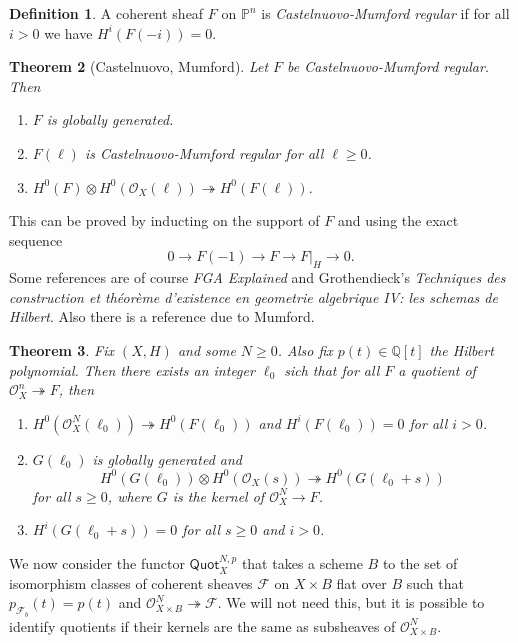 \documentclass[leqno, openany]{memoir}
\newtheorem{thm}{Theorem}[section]
\theoremstyle{definition}
\newtheorem{defn}[thm]{Definition}
\theoremstyle{remark}
\theoremstyle{plain}
\theoremstyle{definition}
\theoremstyle{remark}
\newcommand{\Q}{\mathbb{Q}}
\renewcommand{\P}{\mathbb{P}}
\newcommand{\mc}[1]{\mathcal{#1}}
\newcommand{\ms}[1]{\mathsf{#1}}
\begin{document}
\begin{defn}
    A coherent sheaf $F$ on $\P^n$ is \textit{Castelnuovo-Mumford regular} if for all $i > 0$ we have $H^i(F(-i)) = 0$.
\end{defn}

\begin{thm}[Castelnuovo, Mumford]
    Let $F$ be Castelnuovo-Mumford regular. Then
    \begin{enumerate}
        \item $F$ is globally generated.
        \item $F(\ell)$ is Castelnuovo-Mumford regular for all $\ell \geq 0$.
        \item $H^0(F) \otimes H^0(\mc{O}_X(\ell)) \twoheadrightarrow H^0(F(\ell))$.
    \end{enumerate}
\end{thm}

This can be proved by inducting on the support of $F$ and using the exact sequence
\[ 0 \to F(-1) \to F \to F|_H \to 0. \]
Some references are of course \textit{FGA Explained} and Grothendieck's \textit{Techniques des construction et th\'eor\`eme d'existence en geometrie algebrique IV: les schemas de Hilbert}. Also there is a reference due to Mumford.

\begin{thm}
    Fix $(X, H)$ and some $N \geq 0$. Also fix $p(t) \in \Q[t]$ the Hilbert polynomial. Then there exists an integer $\ell_0$ sich that for all $F$ a quotient of $\mc{O}_X^n \twoheadrightarrow F$, then
    \begin{enumerate}
        \item $H^0(\mc{O}_X^N(\ell_0)) \twoheadrightarrow H^0(F(\ell_0))$ and $H^i(F(\ell_0)) = 0$ for all $i > 0$.
        \item $G(\ell_0)$ is globally generated and
            \[ H^0(G(\ell_0)) \otimes H^0(\mc{O}_X(s)) \twoheadrightarrow H^0(G (\ell_0 + s)) \]
            for all $s \geq 0$, where $G$ is the kernel of $\mc{O}_X^N \to F$.
        \item $H^i(G(\ell_0 + s)) = 0$ for all $s \geq 0$ and $i > 0$.
    \end{enumerate}
\end{thm}

We now consider the functor $\ms{Quot}_X^{N,p}$ that takes a scheme $B$ to the set of isomorphism classes of coherent sheaves $\mc{F}$ on $X \times B$ flat over $B$ such that $p_{\mc{F}_b}(t) = p(t)$ and $\mc{O}_{X \times B}^N \twoheadrightarrow \mc{F}$. We will not need this, but it is possible to identify quotients if their kernels are the same as subsheaves of $\mc{O}_{X \times B}^{N}$.
\end{document}
